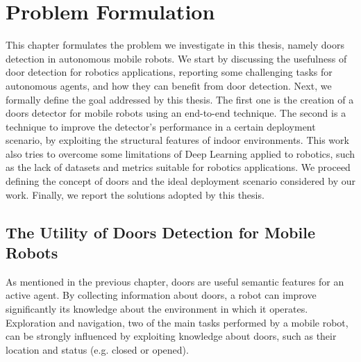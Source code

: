\chapter{Problem Formulation}
\label{capitolo3}
\thispagestyle{empty}

This chapter formulates the problem we investigate in this thesis, namely doors detection in autonomous mobile robots. We start by discussing the usefulness of door detection for robotics applications, reporting some challenging tasks for autonomous agents, and how they can benefit from door detection. Next, we formally define the goal addressed by this thesis. The first one is the creation of a doors detector for mobile robots using an end-to-end technique. The second is a technique to improve the detector's performance in a certain deployment scenario, by exploiting the structural features of indoor environments. This work also tries to overcome some limitations of Deep Learning applied to robotics, such as the lack of datasets and metrics suitable for robotics applications. We proceed defining the concept of doors and the ideal deployment scenario considered by our work. Finally, we report the solutions adopted by this thesis.

\section{The Utility of Doors Detection for Mobile Robots}

As mentioned in the previous chapter, doors are useful semantic features for an active agent. By collecting information about doors, a robot can improve significantly its knowledge about the environment in which it operates. Exploration and navigation, two of the main tasks performed by a mobile robot, can be strongly influenced by exploiting knowledge about doors, such as their location and status (e.g. closed or opened). 

